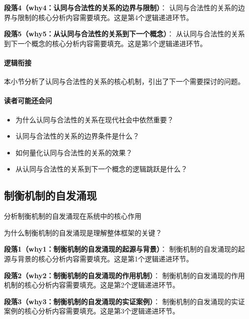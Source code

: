 \documentclass[../main.tex]{subfiles}
\begin{document}
\textbf{段落4（why4：认同与合法性的关系的边界与限制）}：
认同与合法性的关系的边界与限制的核心分析内容需要填充。这是第4个逻辑递进环节。


\textbf{段落5（why5：从认同与合法性的关系到下一个概念）}：
从认同与合法性的关系到下一个概念的核心分析内容需要填充。这是第5个逻辑递进环节。


\paragraph*{逻辑衔接}
本小节分析了认同与合法性的关系的核心机制，引出了下一个需要探讨的问题。

\paragraph*{读者可能还会问}
\begin{itemize}
\item 为什么认同与合法性的关系在现代社会中依然重要？
\item 认同与合法性的关系的边界条件是什么？
\item 如何量化认同与合法性的关系的效果？
\item 从认同与合法性的关系到下一个概念的逻辑跳跃是什么？
\end{itemize}


\subsection{制衡机制的自发涌现}

\begin{motivation}
分析制衡机制的自发涌现在系统中的核心作用
\end{motivation}

\begin{logicmap}
[逻辑链占位]
\end{logicmap}

\begin{questionbox}
为什么制衡机制的自发涌现是理解整体框架的关键？
\end{questionbox}

\textbf{段落1（why1：制衡机制的自发涌现的起源与背景）}：
制衡机制的自发涌现的起源与背景的核心分析内容需要填充。这是第1个逻辑递进环节。


\textbf{段落2（why2：制衡机制的自发涌现的作用机制）}：
制衡机制的自发涌现的作用机制的核心分析内容需要填充。这是第2个逻辑递进环节。


\textbf{段落3（why3：制衡机制的自发涌现的实证案例）}：
制衡机制的自发涌现的实证案例的核心分析内容需要填充。这是第3个逻辑递进环节。
\end{document}
